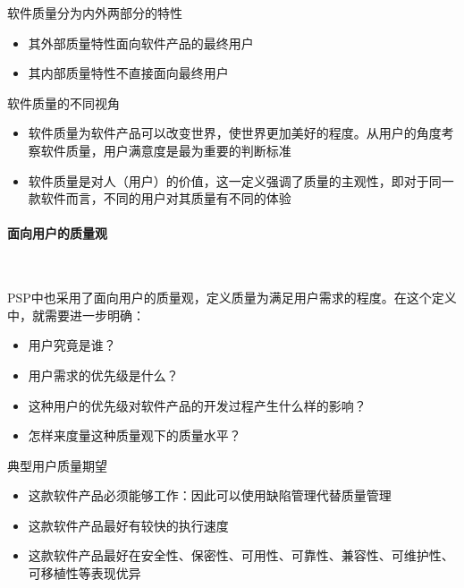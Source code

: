 软件质量分为内外两部分的特性
\vspace{-0.8em}
\begin{multicols}{2}
    \begin{itemize}
        \item 其外部质量特性面向软件产品的最终用户
        \item 其内部质量特性不直接面向最终用户
    \end{itemize}
\end{multicols}
\vspace{-1em}

软件质量的不同视角
\begin{itemize}
    \item 软件质量为软件产品可以改变世界，使世界更加美好的程度。从用户的角度考察软件质量，用户满意度是最为重要的判断标准
    \item 软件质量是对人（用户）的价值，这一定义强调了质量的主观性，即对于同一款软件而言，不同的用户对其质量有不同的体验
\end{itemize}

\paragraph{面向用户的质量观}~{} \par
PSP中也采用了面向用户的质量观，定义质量为满足用户需求的程度。在这个定义中，就需要进一步明确：
\vspace{-0.8em}
\begin{multicols}{2}
    \begin{itemize}
        \item 用户究竟是谁？
        \item 用户需求的优先级是什么？
        \item 这种用户的优先级对软件产品的开发过程产生什么样的影响？
        \item 怎样来度量这种质量观下的质量水平？
    \end{itemize}
\end{multicols}
\vspace{-1em}

典型用户质量期望
\begin{itemize}
    \item 这款软件产品必须能够工作：因此可以使用缺陷管理代替质量管理
    \item 这款软件产品最好有较快的执行速度
    \item 这款软件产品最好在安全性、保密性、可用性、可靠性、兼容性、可维护性、可移植性等表现优异
\end{itemize}

